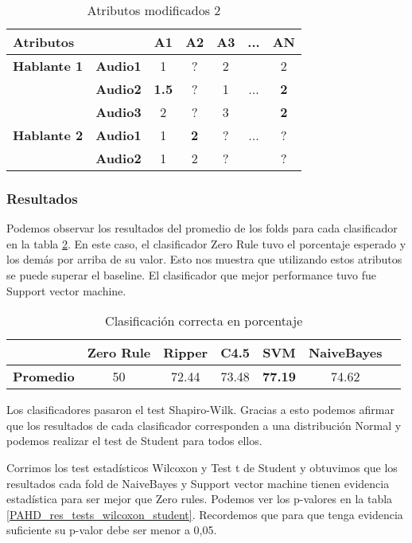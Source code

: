\begin{table}[H]
	\centering
	\begin{tabular}{|l|l|ccccc|}
		\hline
		\multicolumn{2}{|l|}{Atributos} & A1 & A2 & A3 & ... & AN \\
		\hline 
		\textbf{Hablante 1} & \textbf{Audio1} & 1 & ? & 2 & & 2\\
		& \textbf{Audio2} & \textbf{1.5} & ? & 1 & ... & \textbf{2} \\
		& \textbf{Audio3} & 2 & ? & 3 & & \textbf{2} \\
		\hline
		\textbf{Hablante 2} & \textbf{Audio1} & 1 & \textbf{2} & ? & ... & ? \\
		& \textbf{Audio2} & 1 & 2 & ? & & ? \\
		\hline
	\end{tabular}
	\caption{Atributos modificados 2}
	\label{PAHD_attr_mod}
\end{table}

\subsubsection{Resultados}

Podemos observar los resultados del promedio de los folds para cada clasificador en la tabla \ref{PAHD_class_corr_en_pct}. En este caso, el clasificador Zero Rule tuvo el porcentaje esperado y los demás por arriba de su valor. Esto nos muestra que utilizando estos atributos se puede superar el baseline. El clasificador que mejor performance tuvo fue Support vector machine.

\begin{table}[H]
	\centering
	\begin{tabular}{|l|c|c|c|c|c|c|}
		\hline
		\textbf{}  & \textbf{Zero Rule} & \textbf{Ripper} & \textbf{C4.5} & \textbf{SVM} & \textbf{NaiveBayes} \\ \hline
		\textbf{Promedio} & 50 & 72.44 & 73.48 & \textbf{77.19} & 74.62 \\ \hline
	\end{tabular}
	\caption{Clasificación correcta en porcentaje}
	\label{PAHD_class_corr_en_pct}
\end{table}

Los clasificadores pasaron el test Shapiro-Wilk. Gracias a esto podemos afirmar que los resultados de cada clasificador corresponden a una distribución Normal y podemos realizar el test de Student para todos ellos.

Corrimos los test estadísticos Wilcoxon y Test t de Student y obtuvimos que los resultados cada fold de NaiveBayes y Support vector machine tienen evidencia estadística para ser mejor que Zero rules. Podemos ver los p-valores en la tabla \ref{PAHD_res_tests_wilcoxon_student}. Recordemos que para que tenga evidencia suficiente su p-valor debe ser menor a 0,05.

